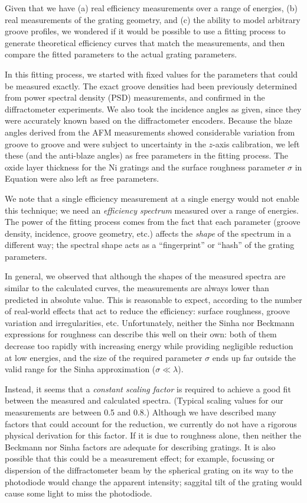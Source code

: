 Given that we have (a) real efficiency measurements over a range of energies, (b) real measurements of the grating geometry, and (c) the ability to model arbitrary groove profiles, we wondered if it would be possible to use a fitting process to generate theoretical efficiency curves that match the measurements, and then compare the fitted parameters to the actual grating parameters.

In this fitting process, we started with fixed values for the parameters that could be measured exactly.  The exact groove densities had been previously determined from power spectral density (PSD) measurements, and confirmed in the diffractometer experiments.  We also took the incidence angles as given, since they were accurately known based on the diffractometer encoders.  Because the blaze angles derived from the AFM measurements showed considerable variation from groove to groove and were subject to uncertainty in the $z$-axis calibration, we left these (and the anti-blaze angles) as free parameters in the fitting process.  The oxide layer thickness for the Ni gratings and the surface roughness parameter $\sigma$ in Equation  were also left as free parameters.
 
 We note that a single efficiency measurement at a single energy would not enable this technique; we need an \emph{efficiency spectrum} measured over a range of energies.  The power of the fitting process comes from the fact that each parameter (groove density, incidence, groove geometry, etc.) affects the \emph{shape} of the spectrum in a different way; the spectral shape acts as a ``fingerprint'' or ``hash'' of the grating parameters.
 
In general, we observed that although the shapes of the measured spectra are similar to the calculated curves, the measurements are always lower than predicted in absolute value.  This is reasonable to expect, according to the number of real-world effects that act to reduce the efficiency: surface roughness, groove variation and irregularities, etc.  Unfortunately, neither the Sinha  nor Beckmann  expressions for roughness can describe this well on their own: both of them decrease too rapidly with increasing energy while providing negligible reduction at low energies, and the size of the required parameter $\sigma$ ends up far outside the valid range for the Sinha approximation ($\sigma \ll \lambda$).

Instead, it seems that a \emph{constant scaling factor} is required to achieve a good fit between the measured and calculated spectra.  (Typical scaling values for our measurements are between 0.5 and 0.8.) Although we have described many factors that could account for the reduction, we currently do not have a rigorous physical derivation for this factor.  If it is due to roughness alone, then neither the Beckmann nor Sinha factors are adequate for describing gratings.  It is also possible that this could be a measurement effect; for example, focussing or dispersion of the diffractometer beam by the spherical grating on its way to the photodiode would change the apparent intensity; saggital tilt of the grating would cause some light to miss the photodiode.

